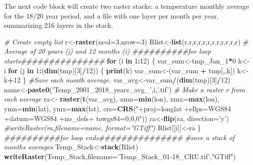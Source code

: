 \documentclass[
  10pt,
  b5paper,
]{book}
\newenvironment{Shaded}{\begin{snugshade}}{\end{snugshade}}
\newcommand{\CommentTok}[1]{\textcolor[rgb]{0.56,0.35,0.01}{\textit{#1}}}
\newcommand{\ControlFlowTok}[1]{\textcolor[rgb]{0.13,0.29,0.53}{\textbf{#1}}}
\newcommand{\DataTypeTok}[1]{\textcolor[rgb]{0.13,0.29,0.53}{#1}}
\newcommand{\DecValTok}[1]{\textcolor[rgb]{0.00,0.00,0.81}{#1}}
\newcommand{\KeywordTok}[1]{\textcolor[rgb]{0.13,0.29,0.53}{\textbf{#1}}}
\newcommand{\NormalTok}[1]{#1}
\newcommand{\OperatorTok}[1]{\textcolor[rgb]{0.81,0.36,0.00}{\textbf{#1}}}
\newcommand{\StringTok}[1]{\textcolor[rgb]{0.31,0.60,0.02}{#1}}
\begin{document}
The next code block will create two raster stacks: a temperature monthly average for the 18/20 year period, and a file with one layer per month per year, summarizing 216 layers in the stack.

\begin{Shaded}
\begin{Highlighting}[]
\CommentTok{# Create empty list}
\NormalTok{r<-}\KeywordTok{raster}\NormalTok{(}\DataTypeTok{ncol=}\DecValTok{3}\NormalTok{,}\DataTypeTok{nrow=}\DecValTok{3}\NormalTok{)}
\NormalTok{Rlist<-}\KeywordTok{list}\NormalTok{(r,r,r,r,r,r,r,r,r,r,r,r)}
 \CommentTok{# Average of 20 years (j)  and 12 months (i) }
\CommentTok{##########for loop starts###############}
 \ControlFlowTok{for}\NormalTok{ (i }\ControlFlowTok{in} \DecValTok{1}\OperatorTok{:}\DecValTok{12}\NormalTok{) \{ }
\NormalTok{var_sum<-tmp_Jan_}\DecValTok{1}\OperatorTok{*}\DecValTok{0}
\NormalTok{k<-i}
\ControlFlowTok{for}\NormalTok{ (j }\ControlFlowTok{in} \DecValTok{1}\OperatorTok{:}\NormalTok{(}\KeywordTok{dim}\NormalTok{(tmp)[}\DecValTok{3}\NormalTok{]}\OperatorTok{/}\DecValTok{12}\NormalTok{)) \{}
\KeywordTok{print}\NormalTok{(k)}
\NormalTok{var_sum<-(var_sum }\OperatorTok{+}\StringTok{ }\NormalTok{tmp[,,k])}
\NormalTok{ k<-k}\OperatorTok{+}\DecValTok{12}
\NormalTok{ \}}
\CommentTok{#Save each month average. }
\NormalTok{ var_avg<-var_sum}\OperatorTok{/}\NormalTok{(}\KeywordTok{dim}\NormalTok{(tmp)[}\DecValTok{3}\NormalTok{]}\OperatorTok{/}\DecValTok{12}\NormalTok{)}
\NormalTok{name<-}\KeywordTok{paste0}\NormalTok{(}\StringTok{'Temp_2001_2018_years_avg_'}\NormalTok{,i,}\StringTok{'.tif'}\NormalTok{)}
 \CommentTok{# Make a raster r from each average}
\NormalTok{ra<-}\StringTok{ }\KeywordTok{raster}\NormalTok{(}\KeywordTok{t}\NormalTok{(var_avg), }\DataTypeTok{xmn=}\KeywordTok{min}\NormalTok{(lon), }\DataTypeTok{xmx=}\KeywordTok{max}\NormalTok{(lon), }\DataTypeTok{ymn=}\KeywordTok{min}\NormalTok{(lat), }\DataTypeTok{ymx=}\KeywordTok{max}\NormalTok{(lat), }\DataTypeTok{crs=}\KeywordTok{CRS}\NormalTok{(}\StringTok{"+proj=longlat +ellps=WGS84 +datum=WGS84 +no_defs+ towgs84=0,0,0"}\NormalTok{))}
\NormalTok{ra<-}\KeywordTok{flip}\NormalTok{(ra, }\DataTypeTok{direction=}\StringTok{'y'}\NormalTok{)}
\CommentTok{#writeRaster(ra,filename=name, format="GTiff")}
\NormalTok{Rlist[[i]]<-ra}
\NormalTok{\}}
\CommentTok{##########for loop ends###############}
 \CommentTok{#save a stack of months averages}
\NormalTok{ Temp_Stack<-}\KeywordTok{stack}\NormalTok{(Rlist)}
\KeywordTok{writeRaster}\NormalTok{(Temp_Stack,}\DataTypeTok{filename=}\StringTok{'Temp_Stack_01-18_CRU.tif'}\NormalTok{,}\StringTok{"GTiff"}\NormalTok{)}

\end{Highlighting}
\end{Shaded}
\end{document}
